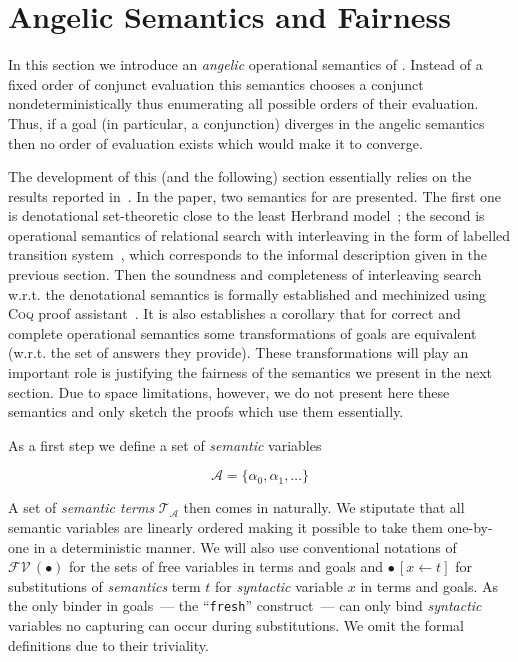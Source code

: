 \section{Angelic Semantics and Fairness}
\label{sec:angelic-semantics}

In this section we introduce an \emph{angelic} operational semantics of \mk. Instead of a fixed order of conjunct evaluation this semantics chooses a conjunct nondeterministically
thus enumerating all possible orders of their evaluation. Thus, if a goal (in particular, a conjunction) diverges in the angelic semantics then no order of evaluation exists which
would make it to converge.

The development of this (and the following) section essentially relies on the results reported in~\cite{fair:semantics}. In the paper, two semantics for \mk are presented. The first one is
denotational set-theoretic close to the least Herbrand model~\cite{Lloyd}; the second is operational semantics of relational search with interleaving in the form of labelled transition
system~\cite{LTS}, which corresponds to the informal description given in the previous section. Then the soundness and completeness of interleaving search w.r.t. the denotational semantics
is formally established and mechinized using \textsc{Coq} proof assistant~\cite{Coq}. It is also establishes a corollary that for correct and complete operational semantics some
transformations of goals are equivalent (w.r.t. the set of answers they provide). These transformations will play an important role is justifying the fairness of the semantics we present
in the next section. Due to space limitations, however, we do not present here these semantics and only sketch the proofs which use them essentially.
 
As a first step we define a set of \emph{semantic} variables

\[
\mathcal{A}=\{\alpha_0,\alpha_1,\dots\}
\]

A set of \emph{semantic terms} $\mathcal{T}_{\mathcal A}$ then comes in naturally. We stiputate that all semantic variables are linearly ordered making it possible to take them one-by-one
in a deterministic manner. We will also use conventional notations of $\mathcal{FV}\,(\bullet)$ for the sets of free variables in terms and goals and $\bullet\,[x\gets t]$ for substitutions
of \emph{semantics} term $t$ for \emph{syntactic} variable $x$ in terms and goals. As the only binder in goals~--- the ``\lstinline|fresh|'' construct~--- can only bind \emph{syntactic}
variables no capturing can occur during substitutions. We omit the formal definitions due to their triviality.

